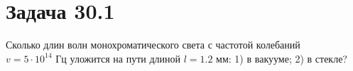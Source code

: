 \section{Задача 30.1}

Сколько длин волн монохроматического света с частотой колебаний $v=5 \cdot 10^{14} \text{ Гц}$ уложится на пути длиной $l=1.2 \text{ мм}$: 1) в вакууме; 2) в стекле?
